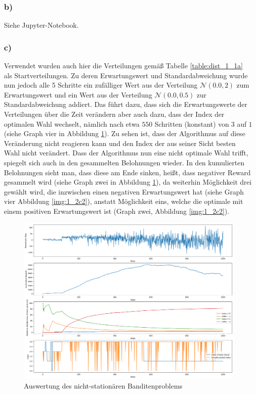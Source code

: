 \documentclass[11pt]{article}
\begin{document}
\subsubsection*{b)}

Siehe Jupyter-Notebook.

\subsubsection*{c)}

Verwendet wurden auch hier die Verteilungen gemäß Tabelle \ref{table:dist_1_1a} als Startverteilungen. Zu deren Erwartungswert und Standardabweichung wurde nun jedoch alle 5 Schritte ein zufälliger Wert aus der Verteilung $\mathcal{N}(0.0, 2)$ zum Erwartungswert und ein Wert aus der Verteilung $\mathcal{N}(0.0, 0.5)$ zur Standardabweichung addiert. Das führt dazu, dass sich die Erwartungswerte der Verteilungen über die Zeit verändern aber auch dazu, dass der Index der optimalen Wahl wechselt, nämlich nach etwa $550$ Schritten (konstant) von $3$ auf $1$ (siehe Graph vier in Abbildung \ref{img:1_2c}). Zu sehen ist, dass der Algorithmus auf diese Veränderung nicht reagieren kann und den Index der aus seiner Sicht besten Wahl nicht verändert. Dass der Algorithmus nun eine nicht optimale Wahl trifft, spiegelt sich auch in den gesammelten Belohnungen wieder. In den kumulierten Belohnungen sieht man, dass diese am Ende sinken, heißt, dass negativer Reward gesammelt wird (siehe Graph zwei in Abbildung \ref{img:1_2c}), da weiterhin Möglichkeit drei gewählt wird, die inzwischen einen negativen Erwartungswert hat (siehe Graph vier Abbildung \ref{img:1_2c2}), anstatt Möglichkeit eins, welche die optimale mit einem positiven Erwartungswert ist (Graph zwei, Abbildung \ref{img:1_2c2}).

\begin{figure}[h]
    \centering
    \includegraphics[width=\textwidth]{img/1_2c.png}
    \caption{Auswertung des nicht-stationären Banditenproblems}
    \label{img:1_2c}
\end{figure}
\end{document}
